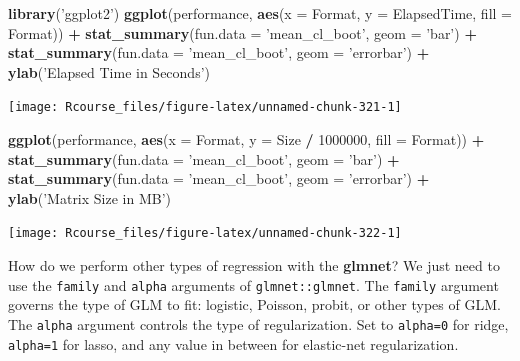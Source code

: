 \documentclass[]{book}
\newenvironment{Shaded}{\begin{snugshade}}{\end{snugshade}}
\newcommand{\DataTypeTok}[1]{\textcolor[rgb]{0.13,0.29,0.53}{#1}}
\newcommand{\DecValTok}[1]{\textcolor[rgb]{0.00,0.00,0.81}{#1}}
\newcommand{\KeywordTok}[1]{\textcolor[rgb]{0.13,0.29,0.53}{\textbf{#1}}}
\newcommand{\NormalTok}[1]{#1}
\newcommand{\OperatorTok}[1]{\textcolor[rgb]{0.81,0.36,0.00}{\textbf{#1}}}
\newcommand{\StringTok}[1]{\textcolor[rgb]{0.31,0.60,0.02}{#1}}
\theoremstyle{definition}
\theoremstyle{definition}
\theoremstyle{definition}
\theoremstyle{remark}
\begin{document}
\begin{Shaded}
\begin{Highlighting}[]
\KeywordTok{library}\NormalTok{(}\StringTok{'ggplot2'}\NormalTok{)}
\KeywordTok{ggplot}\NormalTok{(performance, }\KeywordTok{aes}\NormalTok{(}\DataTypeTok{x =}\NormalTok{ Format, }\DataTypeTok{y =}\NormalTok{ ElapsedTime, }\DataTypeTok{fill =}\NormalTok{ Format)) }\OperatorTok{+}
\StringTok{  }\KeywordTok{stat_summary}\NormalTok{(}\DataTypeTok{fun.data =} \StringTok{'mean_cl_boot'}\NormalTok{, }\DataTypeTok{geom =} \StringTok{'bar'}\NormalTok{) }\OperatorTok{+}
\StringTok{  }\KeywordTok{stat_summary}\NormalTok{(}\DataTypeTok{fun.data =} \StringTok{'mean_cl_boot'}\NormalTok{, }\DataTypeTok{geom =} \StringTok{'errorbar'}\NormalTok{) }\OperatorTok{+}
\StringTok{  }\KeywordTok{ylab}\NormalTok{(}\StringTok{'Elapsed Time in Seconds'}\NormalTok{) }
\end{Highlighting}
\end{Shaded}

\texttt{[image: Rcourse\_files/figure-latex/unnamed-chunk-321-1]}

\begin{Shaded}
\begin{Highlighting}[]
\KeywordTok{ggplot}\NormalTok{(performance, }\KeywordTok{aes}\NormalTok{(}\DataTypeTok{x =}\NormalTok{ Format, }\DataTypeTok{y =}\NormalTok{ Size }\OperatorTok{/}\StringTok{ }\DecValTok{1000000}\NormalTok{, }\DataTypeTok{fill =}\NormalTok{ Format)) }\OperatorTok{+}
\StringTok{  }\KeywordTok{stat_summary}\NormalTok{(}\DataTypeTok{fun.data =} \StringTok{'mean_cl_boot'}\NormalTok{, }\DataTypeTok{geom =} \StringTok{'bar'}\NormalTok{) }\OperatorTok{+}
\StringTok{  }\KeywordTok{stat_summary}\NormalTok{(}\DataTypeTok{fun.data =} \StringTok{'mean_cl_boot'}\NormalTok{, }\DataTypeTok{geom =} \StringTok{'errorbar'}\NormalTok{) }\OperatorTok{+}
\StringTok{  }\KeywordTok{ylab}\NormalTok{(}\StringTok{'Matrix Size in MB'}\NormalTok{) }
\end{Highlighting}
\end{Shaded}

\texttt{[image: Rcourse\_files/figure-latex/unnamed-chunk-322-1]}

How do we perform other types of regression with the \textbf{glmnet}?
We just need to use the \texttt{family} and \texttt{alpha} arguments of \texttt{glmnet::glmnet}.
The \texttt{family} argument governs the type of GLM to fit: logistic, Poisson, probit, or other types of GLM.
The \texttt{alpha} argument controls the type of regularization. Set to \texttt{alpha=0} for ridge, \texttt{alpha=1} for lasso, and any value in between for elastic-net regularization.
\end{document}
